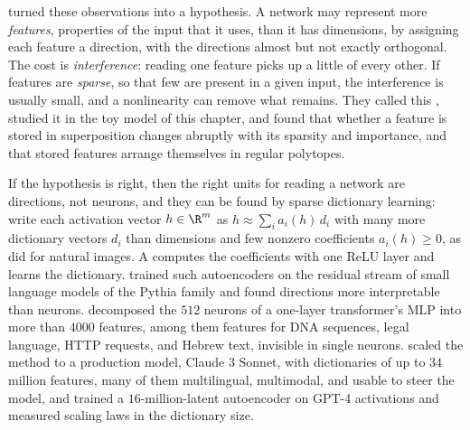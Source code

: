 \begin{refsection}
\Textcite{ElhageEtAl2022} turned these observations into a hypothesis. A network may represent more \emph{features}, properties of the input that it uses, than it has dimensions, by assigning each feature a direction, with the directions almost but not exactly orthogonal. The cost is \emph{interference}: reading one feature picks up a little of every other. If features are \emph{sparse}, so that few are present in a given input, the interference is usually small, and a nonlinearity can remove what remains. They called this , studied it in the toy model of this chapter, and found that whether a feature is stored in superposition changes abruptly with its sparsity and importance, and that stored features arrange themselves in regular polytopes.

If the hypothesis is right, then the right units for reading a network are directions, not neurons, and they can be found by sparse dictionary learning: write each activation vector $h\in\R^m$ as $h\approx\sum_{i}a_i(h)\,d_i$ with many more dictionary vectors $d_i$ than dimensions and few nonzero coefficients $a_i(h)\ge0$, as \textcite{OlshausenField1997} did for natural images. A  computes the coefficients with one ReLU layer and learns the dictionary. \Textcite{CunninghamEtAl2024} trained such autoencoders on the residual stream of small language models of the Pythia family and found directions more interpretable than neurons. \Textcite{BrickenEtAl2023} decomposed the $512$ neurons of a one-layer transformer's MLP into more than $4000$ features, among them features for DNA sequences, legal language, HTTP requests, and Hebrew text, invisible in single neurons. \Textcite{TempletonEtAl2024} scaled the method to a production model, Claude 3 Sonnet, with dictionaries of up to $34$ million features, many of them multilingual, multimodal, and usable to steer the model, and \textcite{GaoEtAl2025} trained a $16$-million-latent autoencoder on GPT-4 activations and measured scaling laws in the dictionary size.



\end{refsection}
